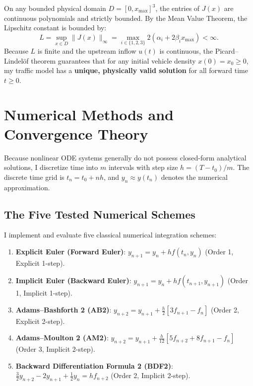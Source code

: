 \documentclass[runningheads]{llncs}
\begin{document}
On any bounded physical domain $D = [0, x_{\max}]^3$, the entries of $J(x)$ are continuous polynomials and strictly bounded. By the Mean Value Theorem, the Lipschitz constant is bounded by:
\begin{equation}
L = \sup_{x \in D} \|J(x)\|_\infty = \max_{i \in \{1, 2, 3\}} 2(\alpha_i + 2\beta_i x_{\max}) < \infty.
\end{equation}
Because $L$ is finite and the upstream inflow $u(t)$ is continuous, the Picard--Lindel\"of theorem guarantees that for any initial vehicle density $x(0) = x_0 \ge 0$, my traffic model has a \textbf{unique, physically valid solution} for all forward time $t \ge 0$.

\section{Numerical Methods and Convergence Theory}
\label{sec:methods}
Because nonlinear ODE systems generally do not possess closed-form analytical solutions, I discretize time into $m$ intervals with step size $h = (T - t_0)/m$. The discrete time grid is $t_n = t_0 + n h$, and $y_n \approx y(t_n)$ denotes the numerical approximation.

\subsection{The Five Tested Numerical Schemes}
I implement and evaluate five classical numerical integration schemes:
\begin{enumerate}
    \item \textbf{Explicit Euler (Forward Euler)}: $y_{n+1} = y_n + h f(t_n, y_n)$ (Order 1, Explicit 1-step).
    \item \textbf{Implicit Euler (Backward Euler)}: $y_{n+1} = y_n + h f(t_{n+1}, y_{n+1})$ (Order 1, Implicit 1-step).
    \item \textbf{Adams--Bashforth 2 (AB2)}: $y_{n+2} = y_{n+1} + \frac{h}{2}[3 f_{n+1} - f_n]$ (Order 2, Explicit 2-step).
    \item \textbf{Adams--Moulton 2 (AM2)}: $y_{n+2} = y_{n+1} + \frac{h}{12}[5 f_{n+2} + 8 f_{n+1} - f_n]$ (Order 3, Implicit 2-step).
    \item \textbf{Backward Differentiation Formula 2 (BDF2)}: $\frac{3}{2} y_{n+2} - 2 y_{n+1} + \frac{1}{2} y_n = h f_{n+2}$ (Order 2, Implicit 2-step).
\end{enumerate}
\end{document}
